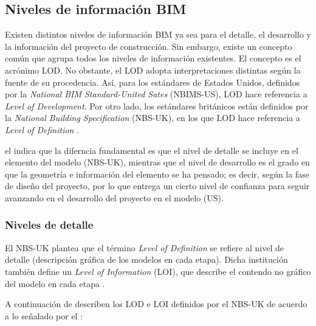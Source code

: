 \subsection{Niveles de información BIM}

Existen distintos niveles de información BIM ya sea para el detalle, el desarrollo y la información del proyecto de construcción. Sin embargo, existe un concepto común que agrupa todos los niveles de información existentes. El concepto es el acrónimo LOD. No obstante, el LOD adopta interpretaciones distintas según la fuente de su procedencia. Así, para los estándares de Estados Unidos, definidos por la \textit{National BIM Standard-United Sates\textregistered} (NBIMS-US\texttrademark), LOD hace referencia a \textit{Level of Development}. Por otro lado, los estándares británicos están definidos por la \textit{National Building Specification} (NBS-UK), en los que LOD hace referencia a \textit{Level of Definition} \cite{trejo2018estudio}.

el  indica que la diferncia fundamental es que el nivel de detalle se incluye en el elemento del modelo (NBS-UK), mientras que el nivel de desarrollo es el grado en que la geometría e información del elemento se ha pensado; es decir, según la fase de diseño del proyecto, por lo que entrega un cierto nivel de confianza para seguir avanzando en el desarrollo del proyecto en el modelo (US).

\subsubsection{Niveles de detalle}

El NBS-UK plantea que el término \textit{Level of Definition} se refiere al nivel de detalle (descripción gráfica de los modelos en cada etapa). Dicha institución también define un \textit{Level of Information} (LOI), que describe el contendo no gráfico del modelo en cada etapa \cite{trejo2018estudio}.

A continuación de describen los LOD e LOI definidos por el NBS-UK de acuerdo a lo señalado por el \cite{bimforum2}:

